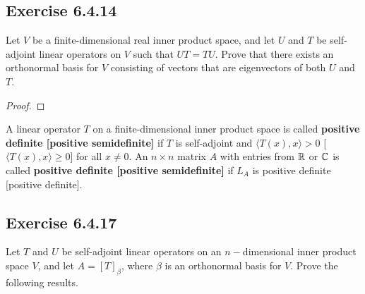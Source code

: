 \subsection*{Exercise 6.4.14} Let \( V  \) be a finite-dimensional real inner product space, and let \( U \) and \( T  \) be self-adjoint linear operators on \( V  \) such that \( UT = TU  \). Prove that there exists an orthonormal basis for \( V  \) consisting of vectors that are eigenvectors of both \( U  \) and \( T  \).
\begin{proof}

\end{proof}




\begin{definition}
    A linear operator \( T  \) on a finite-dimensional inner product space is called \textbf{positive definite [positive semidefinite]} if \( T  \) is self-adjoint and \( \langle T(x) , x \rangle > 0  \) [\( \langle T(x) , x \rangle \geq 0  \)] for all \( x \neq 0  \). 
    An \( n \times n  \) matrix \( A  \) with entries from \( \mathbb{R}  \) or \( \mathbb{C}  \) is called \textbf{positive definite [positive semidefinite]} if \( {L}_{A} \) is positive definite [positive definite].
\end{definition}

\subsection*{Exercise 6.4.17} Let \( T  \) and \( U  \) be self-adjoint linear operators on an \( n- \)dimensional inner product space \( V  \), and let \( A = [T]_{\beta} \), where \( \beta  \) is an orthonormal basis for \( V  \). Prove the following results.

